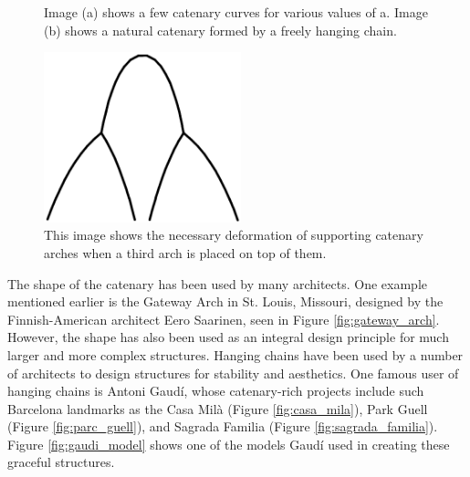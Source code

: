 \documentclass{thesis}
\begin{document}
\begin{figure}
\centering
{}
\caption[Example catenary curves]{Image (a) shows a few catenary curves for various values of a. \cite{img:catenary}
Image (b) shows a natural catenary formed by a freely hanging chain. \cite{img:hanging_chain}}
\end{figure}

\begin{figure}
\centering
\includegraphics[width=2.25in]{images/compound_catenary.png}
\caption[A composite catenary structure]{This image shows the necessary deformation of supporting catenary arches when a third arch is placed
on top of them.}
\label{fig:compound_catenary}
\end{figure}

The shape of the catenary has been used by many architects.  One example mentioned earlier is the Gateway Arch in St. Louis, Missouri, designed by
the Finnish-American architect Eero Saarinen, seen in Figure \ref{fig:gateway_arch}.  However, the shape has also been used as an integral design
principle for much larger and more complex structures.  Hanging chains have been used by a number of architects to design structures for stability and
aesthetics.  One famous user of hanging chains is Antoni Gaud\'{i}, whose catenary-rich projects include such Barcelona landmarks as the Casa Mil\`{a}
(Figure \ref{fig:casa_mila}), Park Guell (Figure \ref{fig:parc_guell}), and Sagrada Familia (Figure \ref{fig:sagrada_familia}).  Figure
\ref{fig:gaudi_model} shows one of the models Gaud\'{i} used in creating these graceful structures.
\end{document}

